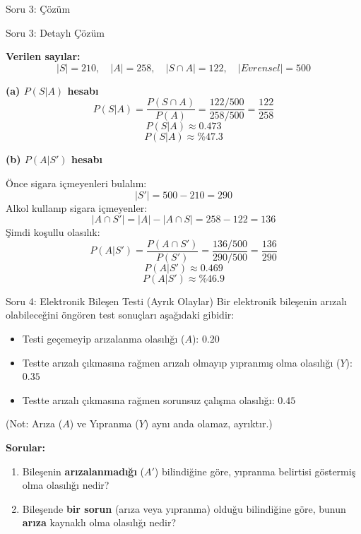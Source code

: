 \documentclass[light]{lutbeamer}
\begin{document}
\begin{frame}{Soru 3: Çözüm}
    \vspace{5cm} 
\end{frame}

\begin{frame}[allowframebreaks]{Soru 3: Detaylı Çözüm}
    \scriptsize
    {\color{red}
    \textbf{Verilen sayılar:}
    \[
    |S|=210,\quad |A|=258,\quad |S\cap A|=122,\quad |Evrensel|=500
    \]
    
    \vspace{0.1cm}
    \textbf{(a) $P(S|A)$ hesabı}
    \[
    P(S|A)=\frac{P(S\cap A)}{P(A)}=\frac{122/500}{258/500}=\frac{122}{258}
    \]
    \[
    P(S|A)\approx 0.473
    \]
    \[
    \boxed{P(S|A)\approx \%47.3}
    \]
    
    \framebreak
    \textbf{(b) $P(A|S')$ hesabı}
    
    Önce sigara içmeyenleri bulalım:
    \[
    |S'|=500-210=290
    \]
    Alkol kullanıp sigara içmeyenler:
    \[
    |A\cap S'|=|A|-|A\cap S|=258-122=136
    \]
    Şimdi koşullu olasılık:
    \[
    P(A|S')=\frac{P(A\cap S')}{P(S')}=\frac{136/500}{290/500}=\frac{136}{290}
    \]
    \[
    P(A|S')\approx 0.469
    \]
    \[
    \boxed{P(A|S')\approx \%46.9}
    \]
    }
\end{frame}

\begin{frame}{Soru 4: Elektronik Bileşen Testi (Ayrık Olaylar)}
    Bir elektronik bileşenin arızalı olabileceğini öngören test sonuçları aşağıdaki gibidir:
    \begin{itemize}
        \item Testi geçemeyip arızalanma olasılığı ($A$): $0.20$
        \item Testte arızalı çıkmasına rağmen arızalı olmayıp yıpranmış olma olasılığı ($Y$): $0.35$
        \item Testte arızalı çıkmasına rağmen sorunsuz çalışma olasılığı: $0.45$
    \end{itemize}
    (Not: Arıza ($A$) ve Yıpranma ($Y$) aynı anda olamaz, ayrıktır.)
    
    \vspace{0.3cm}
    \textbf{Sorular:}
    \begin{enumerate}
        \item[(a)] Bileşenin \textbf{arızalanmadığı} ($A'$) bilindiğine göre, yıpranma belirtisi göstermiş olma olasılığı nedir?
        \item[(b)] Bileşende \textbf{bir sorun} (arıza veya yıpranma) olduğu bilindiğine göre, bunun \textbf{arıza} kaynaklı olma olasılığı nedir?
    \end{enumerate}
\end{frame}
\end{document}
